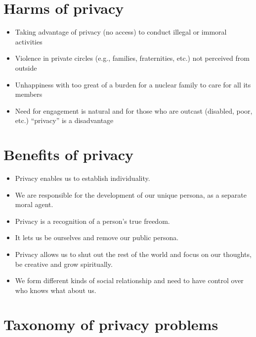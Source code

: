 \documentclass{article}
\begin{document}
\tableofcontents

\newpage

\section{Harms of privacy}
\begin{itemize}
  \item Taking advantage of privacy (no access) to conduct illegal or immoral activities
  \item Violence in private circles (e.g., families, fraternities, etc.) not perceived from outside
  \item Unhappiness with too great of a burden for a nuclear family to care for all its members
  \item Need for engagement is natural and for those who are outcast (disabled, poor, etc.) “privacy” is a disadvantage
\end{itemize}

\section{Benefits of privacy}
\begin{itemize}
  \item Privacy enables us to establish individuality.
  \item We are responsible for the development of our unique persona, as a separate moral agent.
  \item Privacy is a recognition of a person’s true freedom.
  \item It lets us be ourselves and remove our public persona.
  \item Privacy allows us to shut out the rest of the world and focus on our thoughts, be creative and grow spiritually.
  \item We form different kinds of social relationship and need to have control over who knows what about us.
\end{itemize}

\section{Taxonomy of privacy problems}
\end{document}
